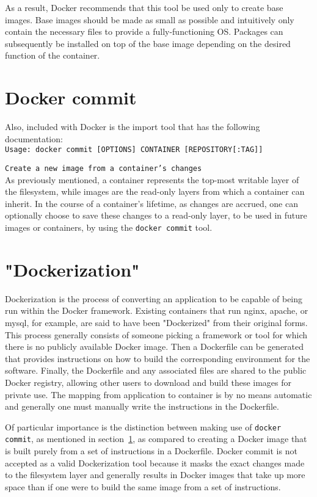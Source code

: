 As a result, Docker recommends that this tool be used only to create base images. Base images should be made as small as possible and intuitively only contain the necessary files to provide a fully-functioning OS. Packages can subsequently be installed on top of the base image depending on the desired function of the container. 

\section{Docker commit}
\label{sec:dockercommit}
Also, included with Docker is the import tool that has the following documentation:\\

\texttt{Usage: docker commit [OPTIONS] CONTAINER [REPOSITORY[:TAG]]}

\texttt{Create a new image from a container's changes} \\

As previously mentioned, a container represents the top-most writable layer of the filesystem, while images are the read-only layers from which a container can inherit. In the course of a container's lifetime, as changes are accrued, one can optionally choose to save these changes to a read-only layer, to be used in future images or containers, by using the \texttt{docker commit} tool.

\section{"Dockerization"}
\label{sec:dockerize}
Dockerization is the process of converting an application to be capable of being run within the Docker framework. Existing containers that run nginx, apache, or mysql, for example, are said to have been "Dockerized" from their original forms. This process generally consists of someone picking a framework or tool for which there is no publicly available Docker image. Then a Dockerfile can be generated that provides instructions on how to build the corresponding environment for the software. Finally, the Dockerfile and any associated files are shared to the public Docker registry, allowing other users to download and build these images for private use. The mapping from application to container is by no means automatic and generally one must manually write the instructions in the Dockerfile. 

Of particular importance is the distinction between making use of \texttt{docker commit}, as mentioned in section~\ref{sec:dockercommit}, as compared to creating a Docker image that is built purely from a set of instructions in a Dockerfile. Docker commit is not accepted as a valid Dockerization tool because it masks the exact changes made to the filesystem layer and generally results in Docker images that take up more space than if one were to build the same image from a set of instructions. 

